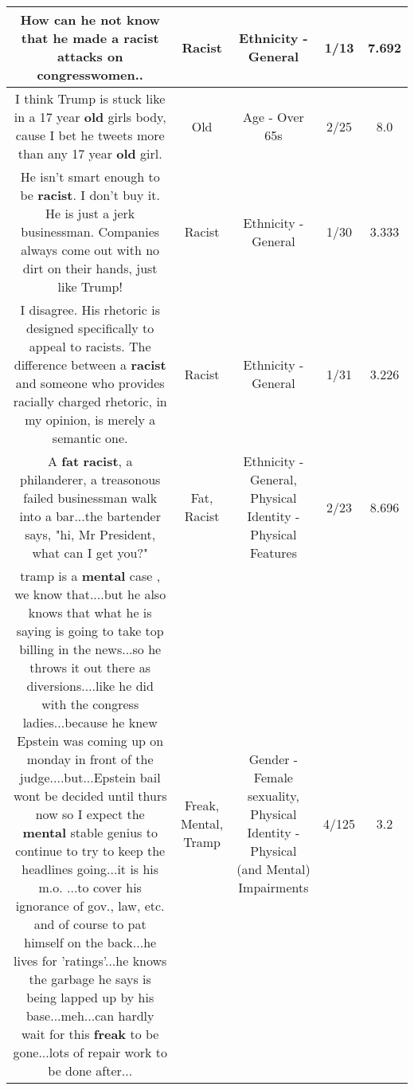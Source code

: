 \documentclass[11pt]{article}
\newlength\mylength
\begin{document}
\begin{center}
\begin{longtable}{|C{.65\mylength}|C{.30\mylength}|C{.12\mylength}|C{.12\mylength}|C{.12\mylength}|}
  \small How can he not know that he made a \textbf{racist} attacks on congresswomen..\normalsize   & Racist & Ethnicity - General & 1/13 & 7.692 \\  \hline
  \small I think Trump is stuck like in a 17 year \textbf{old} girls body,  cause I bet he tweets more than any 17 year \textbf{old} girl.\normalsize   & Old & Age - Over 65s & 2/25 & 8.0 \\  \hline
  \small He isn't smart enough to be \textbf{racist}.  I don't buy it.  He is just a jerk businessman.  Companies always come out with no dirt on their hands, just like Trump!\normalsize   & Racist & Ethnicity - General & 1/30 & 3.333 \\  \hline
  \small I disagree. His rhetoric is designed specifically to appeal to racists. The difference between a \textbf{racist} and someone who provides racially charged rhetoric, in my opinion, is merely a semantic one.\normalsize   & Racist & Ethnicity - General & 1/31 & 3.226 \\  \hline
  \small A \textbf{fat} \textbf{racist}, a philanderer, a treasonous failed businessman walk into a bar...the bartender says, "hi, Mr President, what can I get you?"\normalsize   & Fat, Racist & Ethnicity - General, Physical Identity - Physical Features & 2/23 & 8.696 \\  \hline
  \small tramp is a \textbf{mental} case , we know that....but he also knows that what he is saying is going to take top billing in the news...so he throws it out there as diversions....like he did with the congress ladies...because he knew Epstein was coming up on monday in front of the judge....but...Epstein bail wont be decided until thurs now so I expect the \textbf{mental} stable genius to continue to try to keep the headlines going...it is his m.o. ...to cover his ignorance of gov., law, etc. and of course to pat himself on the back...he lives for 'ratings'...he knows the garbage he says is being lapped up by his base...meh...can hardly wait for this \textbf{freak} to be gone...lots of repair work to be done after...\normalsize   & Freak, Mental, Tramp & Gender - Female sexuality, Physical Identity - Physical (and Mental) Impairments & 4/125 & 3.2 \\  \hline

\end{longtable}
\end{center}
\end{document}
